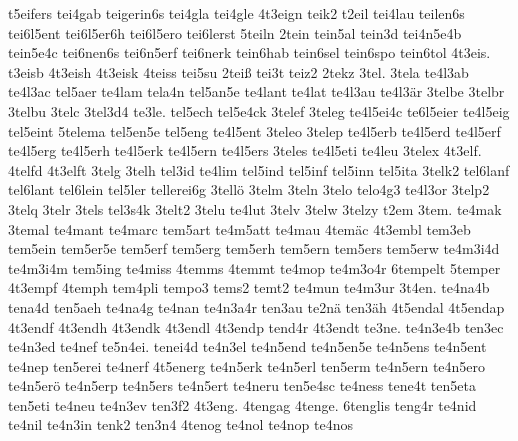 {    t5eifers
    tei4gab
    teigerin6s
    tei4gla
    tei4gle
    4t3eign
    teik2
    t2eil
    tei4lau
    teilen6s
    tei6l5ent
    tei6l5er6h
    tei6l5ero
    tei6lerst
    5teiln
    2tein
    tein5al
    tein3d
    tei4n5e4b
    tein5e4c
    tei6nen6s
    tei6n5erf
    tei6nerk
    tein6hab
    tein6sel
    tein6spo
    tein6tol
    4t3eis.
    t3eisb
    4t3eish
    4t3eisk
    4teiss
    tei5su
    2teiß
    tei3t
    teiz2
    2tekz
    3tel.
    3tela
    te4l3ab
    te4l3ac
    tel5aer
    te4lam
    tela4n
    tel5an5e
    te4lant
    te4lat
    te4l3au
    te4l3är
    3telbe
    3telbr
    3telbu
    3telc
    3tel3d4
    te3le.
    tel5ech
    tel5e4ck
    3telef
    3teleg
    te4l5ei4c
    te6l5eier
    te4l5eig
    tel5eint
    5telema
    tel5en5e
    tel5eng
    te4l5ent
    3teleo
    3telep
    te4l5erb
    te4l5erd
    te4l5erf
    te4l5erg
    te4l5erh
    te4l5erk
    te4l5ern
    te4l5ers
    3teles
    te4l5eti
    te4leu
    3telex
    4t3elf.
    4telfd
    4t3elft
    3telg
    3telh
    tel3id
    te4lim
    tel5ind
    tel5inf
    tel5inn
    tel5ita
    3telk2
    tel6lanf
    tel6lant
    tel6lein
    tel5ler
    tellerei6g
    3tellö
    3telm
    3teln
    3telo
    telo4g3
    te4l3or
    3telp2
    3telq
    3telr
    3tels
    tel3s4k
    3telt2
    3telu
    te4lut
    3telv
    3telw
    3telzy
    t2em
    3tem.
    te4mak
    3temal
    te4mant
    te4marc
    tem5art
    te4m5att
    te4mau
    4temäc
    4t3embl
    tem3eb
    tem5ein
    tem5er5e
    tem5erf
    tem5erg
    tem5erh
    tem5ern
    tem5ers
    tem5erw
    te4m3i4d
    te4m3i4m
    tem5ing
    te4miss
    4temms
    4temmt
    te4mop
    te4m3o4r
    6tempelt
    5temper
    4t3empf
    4temph
    tem4pli
    tempo3
    tems2
    temt2
    te4mun
    te4m3ur
    3t4en.
    te4na4b
    tena4d
    ten5aeh
    te4na4g
    te4nan
    te4n3a4r
    ten3au
    te2nä
    ten3äh
    4t5endal
    4t5endap
    4t3endf
    4t3endh
    4t3endk
    4t3endl
    4t3endp
    tend4r
    4t3endt
    te3ne.
    te4n3e4b
    ten3ec
    te4n3ed
    te4nef
    te5n4ei.
    tenei4d
    te4n3el
    te4n5end
    te4n5en5e
    te4n5ens
    te4n5ent
    te4nep
    ten5erei
    te4nerf
    4t5energ
    te4n5erk
    te4n5erl
    ten5erm
    te4n5ern
    te4n5ero
    te4n5erö
    te4n5erp
    te4n5ers
    te4n5ert
    te4neru
    ten5e4sc
    te4ness
    tene4t
    ten5eta
    ten5eti
    te4neu
    te4n3ev
    ten3f2
    4t3eng.
    4tengag
    4tenge.
    6tenglis
    teng4r
    te4nid
    te4nil
    te4n3in
    tenk2
    ten3n4
    4tenog
    te4nol
    te4nop
    te4nos
}
